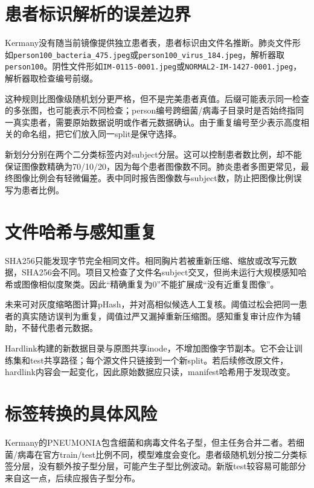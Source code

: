 
\section{患者标识解析的误差边界}

Kermany没有随当前镜像提供独立患者表，患者标识由文件名推断。肺炎文件形如\texttt{person100\_bacteria\_475.jpeg}或\texttt{person100\_virus\_184.jpeg}，解析器取\texttt{person100}。阴性文件形如\texttt{IM-0115-0001.jpeg}或\texttt{NORMAL2-IM-1427-0001.jpeg}，解析器取检查编号前缀。

这种规则比图像级随机划分更严格，但不是完美患者真值。后缀可能表示同一检查的多张图，也可能表示不同检查；person编号跨细菌/病毒子目录时是否始终指同一真实患者，需要原始数据说明或作者元数据确认。由于重复编号至少表示高度相关的命名组，把它们放入同一split是保守选择。

新划分分别在两个二分类标签内对subject分层。这可以控制患者数比例，却不能保证图像数精确为70/10/20，因为每个患者图像数不同。肺炎患者多图更常见，最终图像比例会有轻微偏差。表中同时报告图像数与subject数，防止把图像比例误写为患者比例。

\section{文件哈希与感知重复}

SHA256只能发现字节完全相同文件。相同胸片若被重新压缩、缩放或改写元数据，SHA256会不同。项目又检查了文件名subject交叉，但尚未运行大规模感知哈希或图像相似度聚类。因此“精确重复为0”不能扩展成“没有近重复图像”。

未来可对灰度缩略图计算pHash，并对高相似候选人工复核。阈值过松会把同一患者的真实随访误判为重复，阈值过严又漏掉重新压缩图。感知重复审计应作为辅助，不替代患者元数据。

Hardlink构建的新数据目录与原图共享inode，不增加图像字节副本。它不会让训练集和test共享路径；每个源文件只链接到一个新split。若后续修改原文件，hardlink内容会一起变化，因此原始数据应只读，manifest哈希用于发现改变。

\section{标签转换的具体风险}

Kermany的PNEUMONIA包含细菌和病毒文件名子型，但主任务合并二者。若细菌/病毒在官方train/test比例不同，模型难度会变化。患者级随机划分按二分类标签分层，没有额外按子型分层，可能产生子型比例波动。新版test较容易可能部分来自这一点，后续应报告子型分布。

